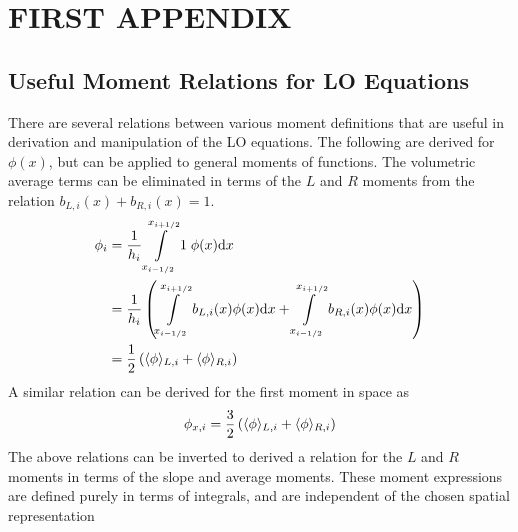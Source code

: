 %
%
%



\chapter{\uppercase{First Appendix}}

\section{Useful Moment Relations for LO Equations}
\label{app:lo_mom_relations}

There are several relations between various moment definitions that are useful in
derivation and manipulation of the LO equations. The following are derived for $\phi(x)$,
but can be applied to general moments of functions.  The volumetric average terms
can be eliminated in terms of the $L$ and $R$ moments from the relation
$b_{L,i}(x)+b_{R,i}(x)=1$.
\begin{align}\label{app:atoL}
    \phi_{i} &= \frac{1}{h_i} \int\limits_{{x_{i-1/2}}}^{{x_{i+1/2}}} 1 \;\phi(x) \mathrm{d} x \\
             &= \frac{1}{h_i} \left(\int\limits_{{x_{i-1/2}}}^{{x_{i+1/2}}} b_{L,i}(x) \phi(x) \mathrm{d} x +
             \int\limits_{{x_{i-1/2}}}^{{x_{i+1/2}}} b_{R,i}(x) \phi(x) \mathrm{d} x \right)\\
             &= \frac{1}{2} \left( \langle \phi \rangle_{L,i} + \langle \phi \rangle_{R,i} \right)
\end{align}
A similar relation can be derived for the first moment in space as
\begin{equation}
    {\phi}_{x,i} = \frac{3}{2} \left(\langle \phi \rangle_{L,i} + \langle \phi \rangle_{R,i}\right)
\end{equation}
The above relations can be inverted to derived a relation for the $L$ and $R$ moments in terms of the slope
and average moments.  These moment expressions are defined purely in terms of integrals,
and are independent of the chosen spatial representation

